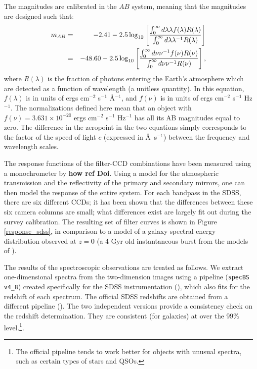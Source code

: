 \documentclass[10pt,preprint]{aastex}
\begin{document}
The magnitudes are calibrated in the $AB$ system, meaning that the
magnitudes are designed such that:
\begin{eqnarray}
\label{ABdef}
m_{AB} &=& -2.41 - 2.5 \log_{10}\left[
\frac{\int_{0}^{\infty} d\lambda \lambda f(\lambda) R(\lambda)}
{\int_{0}^{\infty} d\lambda \lambda^{-1} R(\lambda)}\right]
\cr
&=& -48.60 - 2.5 \log_{10}\left[
\frac{\int_{0}^{\infty} d\nu \nu^{-1} f(\nu) R(\nu)}
{\int_{0}^{\infty} d\nu \nu^{-1} R(\nu)}\right],
\end{eqnarray}
where $R(\lambda)$ is the fraction of photons entering the Earth's
atmosphere which are detected as a function of wavelength (a unitless
quantity). In this equation, $f(\lambda)$ is in units of ergs
cm$^{-2}$ s$^{-1}$ \AA$^{-1}$, and $f(\nu)$ is in units of ergs
cm$^{-2}$ s$^{-1}$ Hz$^{-1}$. The normalizations defined here mean
that an object with $f(\nu) = 3.631 \times 10^{-20}$ ergs cm$^{-2}$
s$^{-1}$ Hz$^{-1}$ has all its AB magnitudes equal to zero.  The
difference in the zeropoint in the two equations simply corresponds to
the factor of the speed of light $c$ (expressed in \AA\ s$^{-1}$)
between the frequency and wavelength scales.

The response functions of the filter-CCD combinations have been
measured using a monochrometer by {\bf how ref Doi}.  Using a model
for the atmospheric transmission and the reflectivity of the primary
and secondary mirrors, one can then model the response of the entire
system. For each bandpass in the SDSS, there are six different CCDs;
it has been shown that the differences between these six camera
columns are small; what differences exist are largely fit out during
the survey calibration. The resulting set of filter curves is shown in
Figure \ref{response_sdss}, in comparison to a model of a galaxy
spectral energy distribution observed at $z=0$ (a 4 Gyr old
instantaneous burst from the models of \citealt{bruzual93a}).

The results of the spectroscopic observations are treated as follows.
We extract one-dimensional spectra from the two-dimension images using
a pipeline ({\tt specBS v4\_8}) created specifically for the SDSS
instrumentation (\citealt{schlegel02a}), which also fits for the
redshift of each spectrum. The official SDSS redshifts are obtained
from a different pipeline (\citealt{subbarao02a}). The two independent
versions provide a consistency check on the redshift
determination. They are consistent (for galaxies) at over the 99\%
level.\footnote{The official pipeline tends to work better for objects
with unusual spectra, such as certain types of stars and QSOs.}.
\end{document}
